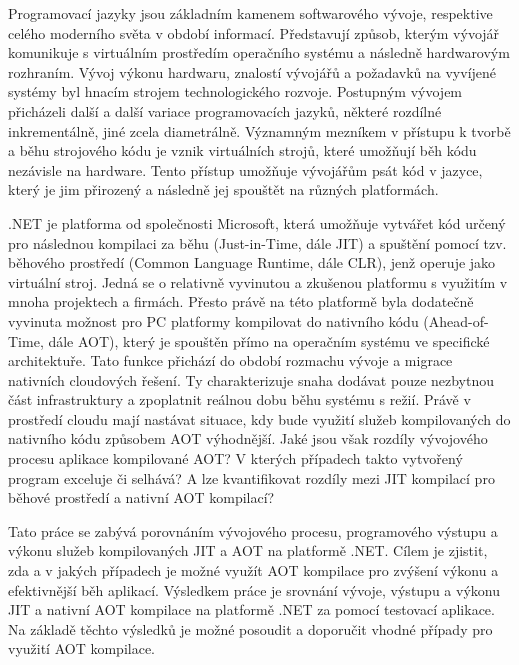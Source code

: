 Programovací jazyky jsou základním kamenem softwarového vývoje, respektive celého moderního světa v období informací. Představují způsob, kterým vývojář komunikuje s virtuálním prostředím operačního systému a následně hardwarovým rozhraním. Vývoj výkonu hardwaru, znalostí vývojářů a požadavků na vyvíjené systémy byl hnacím strojem technologického rozvoje. Postupným vývojem přicházeli další a další variace programovacích jazyků, některé rozdílné inkrementálně, jiné zcela diametrálně. Významným mezníkem v přístupu k tvorbě a běhu strojového kódu je vznik virtuálních strojů, které umožňují běh kódu nezávisle na hardware. Tento přístup umožňuje vývojářům psát kód v jazyce, který je jim přirozený a následně jej spouštět na různých platformách.

.NET je platforma od společnosti Microsoft, která umožňuje vytvářet kód určený pro následnou kompilaci za běhu (Just-in-Time, dále JIT) a spuštění pomocí tzv. běhového prostředí (Common Language Runtime, dále CLR), jenž operuje jako virtuální stroj. Jedná se o relativně vyvinutou a zkušenou platformu s využitím v mnoha projektech a firmách. Přesto právě na této platformě byla dodatečně vyvinuta možnost pro PC platformy kompilovat do nativního kódu (Ahead-of-Time, dále AOT), který je spouštěn přímo na operačním systému ve specifické architektuře. Tato funkce přichází do období rozmachu vývoje a migrace nativních cloudových řešení. Ty charakterizuje snaha dodávat pouze nezbytnou část infrastruktury a zpoplatnit reálnou dobu běhu systému s režií. Právě v prostředí cloudu mají nastávat situace, kdy bude využití služeb kompilovaných do nativního kódu způsobem AOT výhodnější. Jaké jsou však rozdíly vývojového procesu aplikace kompilované AOT? V kterých případech takto vytvořený program exceluje či selhává? A lze kvantifikovat rozdíly mezi JIT kompilací pro běhové prostředí a nativní AOT kompilací?

Tato práce se zabývá porovnáním vývojového procesu, programového výstupu a výkonu služeb kompilovaných JIT a AOT na platformě .NET. Cílem je zjistit, zda a v jakých případech je možné využít AOT kompilace pro zvýšení výkonu a efektivnější běh aplikací. Výsledkem práce je srovnání vývoje, výstupu a výkonu JIT a nativní AOT kompilace na platformě .NET za pomocí testovací aplikace. Na základě těchto výsledků je možné posoudit a doporučit vhodné případy pro využití AOT kompilace.